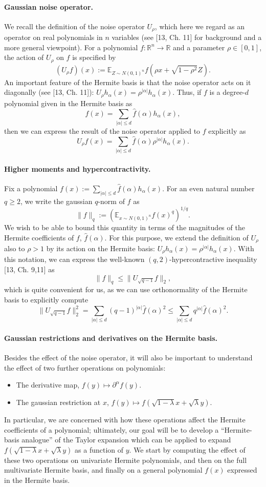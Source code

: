 \documentclass[10pt,a4paper]{article}
\begin{document}
\paragraph{Gaussian noise operator.} We recall the definition of the noise operator $U_\rho$, which here we regard as an operator on real polynomials in $n$ variables (see [13, Ch. 11] for background and a more general viewpoint). For a polynomial $f:\mathbb R^n\to\mathbb R$ and a parameter $\rho\in[0,1]$, the action of $U_\rho$ on $f$ is specified by
\[(U_\rho f)(x):=\mathbb E_{Z\sim N(0,1)^n}f(\rho x+\sqrt{1-\rho^2}Z).\]
An important feature of the Hermite basis is that the noise operator acts on it diagonally (see [13, Ch. 11]): $U_\rho h_\alpha(x)=\rho^{|\alpha|}h_\alpha(x)$. Thus, if $f$ is a degree-$d$ polynomial given in the Hermite basis as
\[f(x)=\sum_{|\alpha|\leq d}\widehat f(\alpha)h_\alpha(x),\]
then we can express the result of the noise operator applied to $f$ explicitly as
\[U_\rho f(x)=\sum_{|\alpha|\leq d}\widehat f(\alpha)\rho^{|\alpha|}h_\alpha(x).\]
\paragraph{Higher moments and hypercontractivity.} Fix a polynomial $f(x):=\sum_{|\alpha|\leq d}\widehat f(\alpha)h_\alpha(x)$. For an even natural number $q\geq2$, we write the gaussian $q$-norm of $f$ as
\[\|f\|_q:=\left(\mathbb E_{x\sim N(0,1)^n}f(x)^q\right)^{1/q}.\]
We wish to be able to bound this quantity in terms of the magnitudes of the Hermite coefficients of $f$, $\widehat f(\alpha)$. For this purpose, we extend the definition of $U_\rho$ also to $\rho>1$ by its action on the Hermite basis: $U_\rho h_\alpha(x)=\rho^{|\alpha|}h_\alpha(x)$. With this notation, we can express the well-known $(q,2)$-hypercontractive inequality [13, Ch. 9,11] as
\[\|f\|_q\leq\|U_{\sqrt{q-1}}f\|_2,\]
which is quite convenient for us, as we can use orthonormality of the Hermite basis to explicitly compute
\[\|U_{\sqrt{q-1}}f\|_2^2=\sum_{|\alpha|\leq d}(q-1)^{|\alpha|}\widehat f(\alpha)^2\leq\sum_{|\alpha|\leq d}q^{|\alpha|}\widehat f(\alpha)^2.\]
\paragraph{Gaussian restrictions and derivatives on the Hermite basis.} Besides the effect of the noise operator, it will also be important to understand the effect of two further operations on polynomials:
\begin{itemize}
\item The derivative map, $f(y)\mapsto\partial^\alpha f(y)$.
\item The gaussian restriction at $x$, $f(y)\mapsto f(\sqrt{1-\lambda}x+\sqrt\lambda y)$.
\end{itemize}
In particular, we are concerned with how these operations affect the Hermite coefficients of a polynomial; ultimately, our goal will be to develop a ``Hermite-basis analogue'' of the Taylor expansion which can be applied to expand $f(\sqrt{1-\lambda}x+\sqrt\lambda y)$ as a function of $y$. We start by computing the effect of these two operations on univariate Hermite polynomials, and then on the full multivariate Hermite basis, and finally on a general polynomial $f(x)$ expressed in the Hermite basis.
\end{document}
